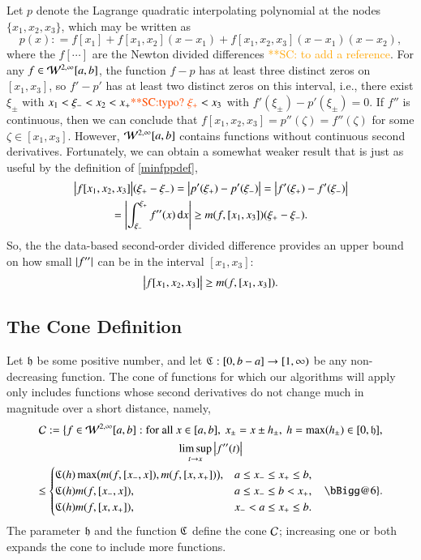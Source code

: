 \documentclass[review]{elsarticle}
\makeatletter
\newcommand{\Vast}{\bBigg@{6}}
\newcommand{\Vastr}{\mathclose\Vast}
\newcommand{\scnote}[1]{ {\textcolor{orange}  {\mbox{**SC:} #1}}}
\makeatother
\begin{document}
Let $p$ denote the Lagrange quadratic interpolating polynomial at the nodes
$\{x_1, x_2, x_3\}$, which may be written as
\begin{equation*}
p(x) : = f[x_1] + f[x_1, x_2](x-x_1) + f[x_1, x_2, x_3](x-x_1)(x-x_2), 
\end{equation*}
where the $f[\cdots]$ are the Newton divided differences \cite{}\scnote{to add a reference}. For any $f \in
\mathcal{W}^{2,\infty}[a,b]$, the function $f - p$ has at least three distinct zeros on
$[x_1, x_3]$, so $f' - p'$ has at least two distinct zeros on this interval,
i.e., there exist $\xi_\pm$ with $x_1 < \xi_- < x_2 < x_+ \scnote{\mbox{typo?  }  \xi_+} < x_3$ with
$f'(\xi_\pm) - p'(\xi_{\pm}) = 0$. If $f''$ is continuous, then we can conclude
that $ f[x_1, x_2, x_3]= p''(\zeta) =f''(\zeta) $ for some $\zeta \in [x_1,
x_3]$. However, $\mathcal{W}^{2,\infty}[a,b]$ contains functions without continuous
second derivatives. Fortunately, we can obtain a somewhat weaker result that is
just as useful by the definition of \eqref{minfppdef},
\begin{multline*}
\bigl \lvert f[x_1, x_2, x_3] \bigr \rvert(\xi_+  - \xi_-) = \left \lvert p'(\xi_+) - p'(\xi_-) \right \rvert =  \left \lvert f'(\xi_+) - f'(\xi_-) \right \rvert \\
= \left \lvert \int_{\xi_-}^{\xi_+} f''(x) \, {\rm d} x \right \rvert \ge m(f,[x_1, x_3]) (\xi_+  - \xi_-).
\end{multline*}
So, the the data-based second-order divided difference provides an upper
bound on how small $\left \lvert f'' \right \rvert$ can be in the interval $[x_1, x_3]$:
\begin{equation}
\bigl \lvert f[x_1, x_2, x_3] \bigr \rvert \ge m(f,[x_1, x_3]).
\end{equation}

\subsection{The Cone Definition}  \label{sec:conedef}

Let $\mathfrak{h}$ be some positive number, and let $\mathfrak{C} : [0,b-a] \to [1,\infty)$ be any
non-decreasing function. The cone of functions for which our algorithms will
apply only includes functions whose second derivatives do not change much in
magnitude over a short distance, namely,
\begin{multline} \label{conedef}
\cc : = \bigl \{ f \in \cw^{2,\infty}[a,b] : \text{for all }x \in [a,b], \ x_\pm = x \pm h_\pm, \ h = \max(h_{\pm}) \in [0, \fh], \\  \limsup_{t \to x}\abs{f''(t)} \\
\le \begin{cases} \fC(h) \max\bigl(m(f,[x_-,x]),m(f,[x,x_+])\bigr), & a \le x_- \le x_+ \le b,\\
\fC(h) m(f,[x_-,x]), & a \le x_- \le b <  x_+, \\
\fC(h) m(f,[x,x_+]), & x_- < a \le x_+ \le b.
\end{cases} \quad
 \Vastr \}.
\end{multline}
The parameter $\mathfrak{h}$ and the function $\mathfrak{C}$ define the cone $\mathcal{C}$; increasing
one or both expands the cone to include more functions.
\end{document}
